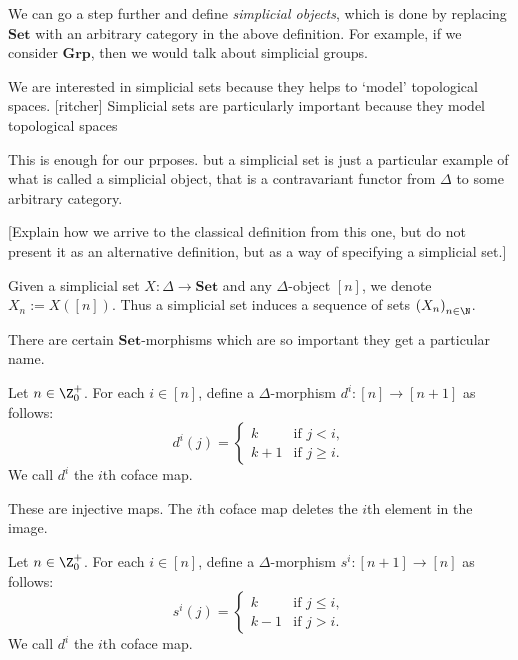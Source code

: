 We can go a step further and define   \textit{simplicial objects}, which is done by replacing \(\mathbf{Set}\) with an arbitrary category in the above definition. 
For example, if we consider \(\mathbf{Grp}\), then we would talk about simplicial groups.

We are interested in simplicial sets because they helps to `model' topological spaces. 
[ritcher] Simplicial sets are particularly important because they model topological spaces

This is enough for our prposes.
but
a simplicial set is just a particular example of what is called a simplicial object, that is a contravariant functor from \(\Delta\) to some arbitrary category.

[Explain how we arrive to the classical definition from this one, but do not present it as an alternative definition, but as a way of specifying a simplicial set.]



\begin{remark}
    Given a simplicial set \(X\colon \Delta\to \mathbf{Set}\) and any \(\Delta\)-object \([n]\), 
    we denote \(X_n := X([n])\).
    Thus a simplicial set induces a sequence of sets \(\left( X_n \right)_{n\in\N}\).
\end{remark}

There are certain \(\mathbf{Set}\)-morphisms which are so important they get a particular name.

\begin{definition}
    Let \(n\in \Z^+_0\). 
    For each \(i\in [n]\), 
    define a \(\Delta\)-morphism \(d^i\colon [n] \to [n+1]\) as follows:
    \[d^i(j) = \begin{cases}
        k& \text{if } j < i,\\
        k+1 & \text{if } j\geq  i.
    \end{cases}\]
    We call \(d^i\) the \(i\)th coface map.
\end{definition}

These are injective maps.
The \(i\)th coface map deletes the \(i\)th element in the image.

\begin{definition}
    Let \(n\in \Z^+_0\). 
    For each \(i\in [n]\), 
    define a \(\Delta\)-morphism \(s^i\colon [n+1] \to [n]\) as follows:
    \[s^i(j) = \begin{cases}
        k& \text{if } j \leq i,\\
        k-1 & \text{if } j >  i.
    \end{cases}\]
    We call \(d^i\) the \(i\)th coface map.
\end{definition}

